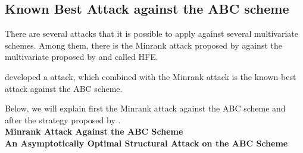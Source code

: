 \subsection{Known Best Attack against the ABC scheme}
There are several attacks that it is possible to apply against several multivariate schemes. Among them, there is  the Minrank attack proposed by against the multivariate proposed by and called HFE. 
 
\citet{Moody2014} developed a attack, which combined with the Minrank attack is the known best attack against the ABC scheme.

Below, we will explain first the Minrank attack against the ABC scheme and after the strategy proposed by \citet{Moody2014}.\\
\noindent
\textbf{Minrank Attack Against the ABC Scheme}\\
\noindent
\textbf{An Asymptotically Optimal Structural Attack on the ABC Scheme}
